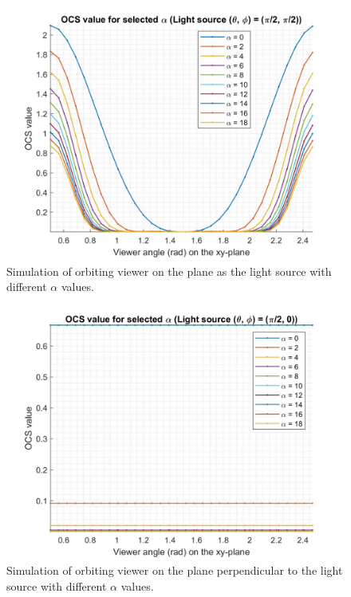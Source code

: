 \documentclass[11pt]{amsart}
\theoremstyle{definition}
\begin{document}
\begin{figure}[h]
\includegraphics[scale=0.2]{./figs/OCS_parallel_plane}    
\caption{Simulation of orbiting viewer on the plane as the light source with different $\alpha$ values.}    
\label{OCSParallelPlane}
\end{figure}

\begin{figure}[h]
\includegraphics[scale=0.2]{./figs/OCS_perpendicular_plane}
\caption{Simulation of orbiting viewer on the plane perpendicular to the light source with different $\alpha$ values.}
\label{OCSPerpendicularPlane}
\end{figure}
\end{document}
